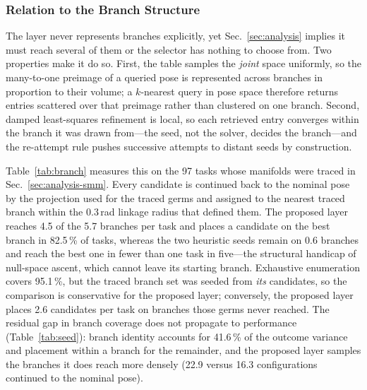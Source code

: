 \documentclass[journal]{IEEEtran}
\newcommand{\phBranchVar}{41.6}      %
\begin{document}
\subsubsection{Relation to the Branch Structure}
\label{sec:branchlink}
The layer never represents branches explicitly, yet Sec.~\ref{sec:analysis}
implies it must reach several of them or the selector has nothing to
choose from. Two properties make it do so. First, the table samples the
\textit{joint} space uniformly, so the many-to-one preimage of a queried
pose is represented across branches in proportion to their volume; a
$k$-nearest query in pose space therefore returns entries scattered over
that preimage rather than clustered on one branch. Second, damped
least-squares refinement is local, so each retrieved entry converges
within the branch it was drawn from---the seed, not the solver, decides
the branch---and the re-attempt rule pushes successive attempts to
distant seeds by construction.

Table~\ref{tab:branch} measures this on the 97 tasks whose manifolds
were traced in Sec.~\ref{sec:analysis-smm}. Every candidate is continued back
to the nominal pose by the projection used for the traced germs and
assigned to the nearest traced branch within the $0.3$\,rad linkage
radius that defined them. The proposed layer reaches 4.5 of the 5.7
branches per task and places a candidate on the best branch in 82.5\,\%
of tasks, whereas the two heuristic seeds remain on 0.6 branches and
reach the best one in fewer than one task in five---the structural
handicap of null-space ascent, which cannot leave its starting branch.
Exhaustive enumeration covers 95.1\,\%, but the traced branch set was
seeded from \textit{its} candidates, so the comparison is conservative
for the proposed layer; conversely, the proposed layer places 2.6
candidates per task on branches those germs never reached. The residual
gap in branch coverage does not propagate to performance
(Table~\ref{tab:seed}): branch identity accounts for \phBranchVar\,\% of
the outcome variance and placement within a branch for the remainder,
and the proposed layer samples the branches it does reach more densely
(22.9 versus 16.3 configurations continued to the nominal pose).
\end{document}
